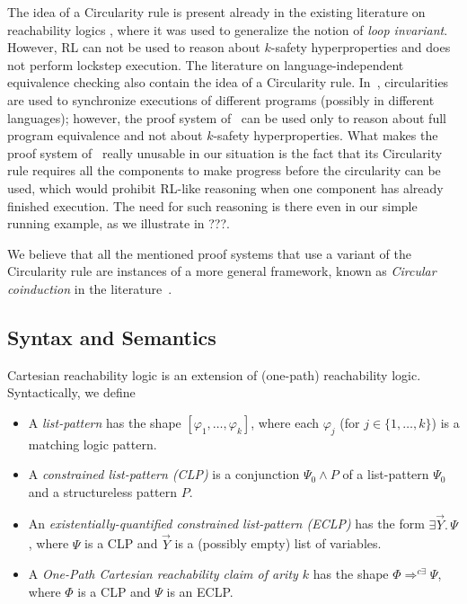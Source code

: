 The idea of a Circularity rule is present already 
in the existing literature on reachability logics \cite{RosuS12oopsla,RosuSCM13lics,StefanescuCMMSR19},
where it was used to generalize the notion of \emph{loop invariant}.
However, RL can not be used to reason about $k$-safety hyperproperties and does not perform lockstep execution.
The literature on language-independent equivalence checking also contain the idea of a Circularity rule.
In~\cite{CiobacaLRR16}, circularities are used to synchronize executions of different programs (possibly in different languages);
however, the proof system of~\cite{CiobacaLRR16} can be used only to reason about full program equivalence
and not about $k$-safety hyperproperties.
What makes the proof system of~\cite{CiobacaLRR16} really unusable in our situation is the fact that its
Circularity rule requires all the components to make progress before the circularity can be used,
which would prohibit RL-like reasoning when one component has already finished execution.
The need for such reasoning is there even in our simple running example, as we illustrate in ???.

We believe that all the mentioned proof systems that use a variant of the Circularity rule are instances of a more general
framework, known as \emph{Circular coinduction} in the literature~\cite{RosuL09CircularCoinduction}.

\subsection{Syntax and Semantics}

Cartesian reachability logic is an extension of (one-path) reachability logic.
Syntactically, we define
\begin{itemize}
    \item 
A \emph{list-pattern} has the shape $[\varphi_1,\ldots,\varphi_k]$,
          where each $\varphi_j$ (for $j \in \{ 1, \ldots, k \} $) is a matching logic pattern.
    \item
          A \emph{constrained list-pattern (CLP)} is a conjunction $\Psi_0 \land P$
          of a list-pattern $\Psi_0$ and a structureless pattern $P$.
    \item
          An \emph{existentially-quantified constrained list-pattern (ECLP)} has the form
          $\exists \vec{Y}.\, \Psi$, where $\Psi$ is a CLP and $\vec{Y}$ is a (possibly empty) list of variables.
    \item
          A \emph{One-Path Cartesian reachability claim of arity $k$} has the shape
          $\Phi \Rightarrow^{c\exists} \Psi$,
          where $\Phi$ is a CLP and $\Psi$ is an ECLP.
\end{itemize}

